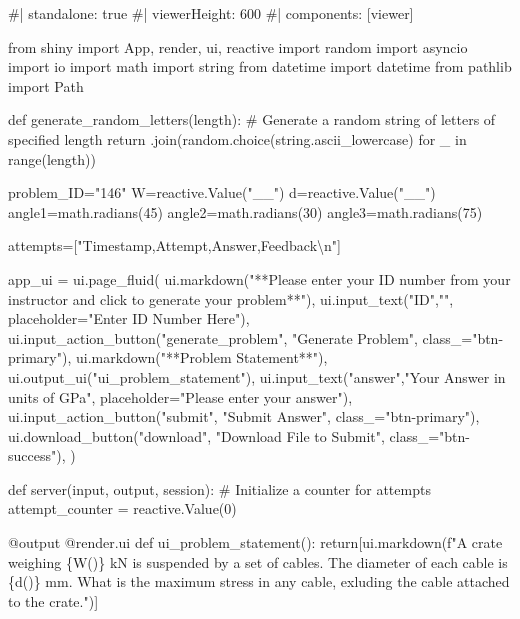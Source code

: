 \documentclass[
  letterpaper,
  DIV=11,
  numbers=noendperiod]{scrreprt}
\newenvironment{Shaded}{\begin{snugshade}}{\end{snugshade}}
\newcommand{\NormalTok}[1]{\textcolor[rgb]{0.00,0.23,0.31}{#1}}
\begin{document}
\begin{Shaded}
\begin{Highlighting}[]
\NormalTok{\#| standalone: true}
\NormalTok{\#| viewerHeight: 600}
\NormalTok{\#| components: [viewer]}

\NormalTok{from shiny import App, render, ui, reactive}
\NormalTok{import random}
\NormalTok{import asyncio}
\NormalTok{import io}
\NormalTok{import math}
\NormalTok{import string}
\NormalTok{from datetime import datetime}
\NormalTok{from pathlib import Path}


\NormalTok{def generate\_random\_letters(length):}
\NormalTok{    \# Generate a random string of letters of specified length}
\NormalTok{    return \textquotesingle{}\textquotesingle{}.join(random.choice(string.ascii\_lowercase) for \_ in range(length)) }

\NormalTok{problem\_ID="146"}
\NormalTok{W=reactive.Value("\_\_")}
\NormalTok{d=reactive.Value("\_\_")}
\NormalTok{angle1=math.radians(45)}
\NormalTok{angle2=math.radians(30)}
\NormalTok{angle3=math.radians(75)}

\NormalTok{attempts=["Timestamp,Attempt,Answer,Feedback\textbackslash{}n"]}

\NormalTok{app\_ui = ui.page\_fluid(}
\NormalTok{    ui.markdown("**Please enter your ID number from your instructor and click to generate your problem**"),}
\NormalTok{    ui.input\_text("ID","", placeholder="Enter ID Number Here"),}
\NormalTok{    ui.input\_action\_button("generate\_problem", "Generate Problem", class\_="btn{-}primary"),}
\NormalTok{    ui.markdown("**Problem Statement**"),}
\NormalTok{    ui.output\_ui("ui\_problem\_statement"),}
\NormalTok{    ui.input\_text("answer","Your Answer in units of GPa", placeholder="Please enter your answer"),}
\NormalTok{    ui.input\_action\_button("submit", "Submit Answer", class\_="btn{-}primary"),}
\NormalTok{    ui.download\_button("download", "Download File to Submit", class\_="btn{-}success"),}
\NormalTok{)}


\NormalTok{def server(input, output, session):}
\NormalTok{    \# Initialize a counter for attempts}
\NormalTok{    attempt\_counter = reactive.Value(0)}

\NormalTok{    @output}
\NormalTok{    @render.ui}
\NormalTok{    def ui\_problem\_statement():}
\NormalTok{        return[ui.markdown(f"A crate weighing \{W()\} kN is suspended by a set of cables. The diameter of each cable is \{d()\}  mm. What is the maximum stress in any cable, exluding the cable attached to the crate.")]}
    

\end{Highlighting}
\end{Shaded}
\end{document}
